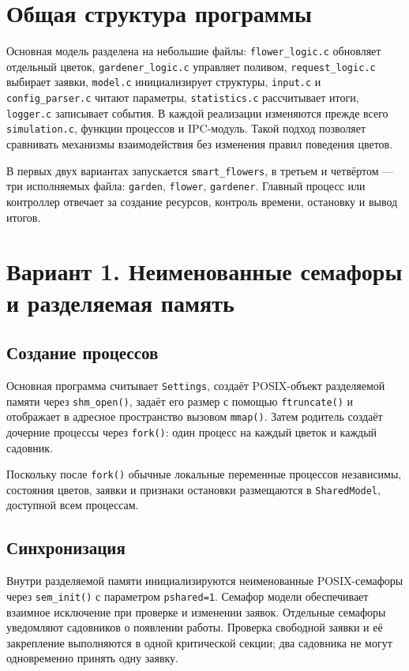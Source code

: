 \documentclass[12pt,a4paper]{article}
\begin{document}
\section{Общая структура программы}
Основная модель разделена на небольшие файлы: \texttt{flower\_logic.c} обновляет отдельный цветок, \texttt{gardener\_logic.c} управляет поливом, \texttt{request\_logic.c} выбирает заявки, \texttt{model.c} инициализирует структуры, \texttt{input.c} и \texttt{config\_parser.c} читают параметры, \texttt{statistics.c} рассчитывает итоги, \texttt{logger.c} записывает события. В каждой реализации изменяются прежде всего \texttt{simulation.c}, функции процессов и IPC-модуль. Такой подход позволяет сравнивать механизмы взаимодействия без изменения правил поведения цветов.

В первых двух вариантах запускается \texttt{smart\_flowers}, в третьем и четвёртом --- три исполняемых файла: \texttt{garden}, \texttt{flower}, \texttt{gardener}. Главный процесс или контроллер отвечает за создание ресурсов, контроль времени, остановку и вывод итогов.

\section{Вариант 1. Неименованные семафоры и разделяемая память}
\subsection{Создание процессов}
Основная программа считывает \texttt{Settings}, создаёт POSIX-объект разделяемой памяти через \texttt{shm\_open()}, задаёт его размер с помощью \texttt{ftruncate()} и отображает в адресное пространство вызовом \texttt{mmap()}. Затем родитель создаёт дочерние процессы через \texttt{fork()}: один процесс на каждый цветок и каждый садовник.

Поскольку после \texttt{fork()} обычные локальные переменные процессов независимы, состояния цветов, заявки и признаки остановки размещаются в \texttt{SharedModel}, доступной всем процессам.

\subsection{Синхронизация}
Внутри разделяемой памяти инициализируются неименованные POSIX-семафоры через \texttt{sem\_init()} с параметром \texttt{pshared=1}. Семафор модели обеспечивает взаимное исключение при проверке и изменении заявок. Отдельные семафоры уведомляют садовников о появлении работы. Проверка свободной заявки и её закрепление выполняются в одной критической секции; два садовника не могут одновременно принять одну заявку.
\end{document}
